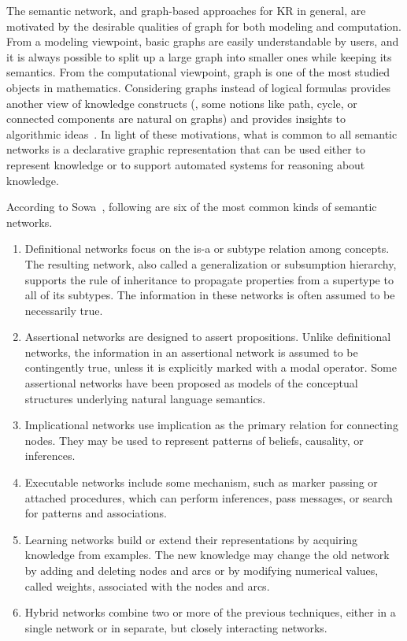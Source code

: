 The semantic network, and graph-based approaches for KR in general, are motivated by the desirable qualities of graph for both modeling and computation. From a modeling viewpoint, basic graphs are easily understandable by users, and it is always possible to split up a large graph into smaller ones while keeping its semantics. From the computational viewpoint, graph is one of the most studied objects in mathematics. Considering graphs instead of logical formulas provides another view of knowledge constructs (\eg, some notions like path, cycle, or connected components are natural on graphs) and provides insights to algorithmic ideas~\cite{CheinMugnier08}. In light of these motivations, what is common to all semantic networks is a declarative graphic representation that can be used either to represent knowledge or to support automated systems for reasoning about knowledge.

According to Sowa~\cite{Sowa1987SemanticNet}, following are six of the most common kinds of semantic networks.
\begin{enumerate}
\item Definitional networks focus on the is-a or subtype relation among concepts. The resulting network, also called a generalization or subsumption hierarchy, supports the rule of inheritance to propagate properties from a supertype to all of its subtypes. The information in these networks is often assumed to be necessarily true.

\item Assertional networks are designed to assert propositions. Unlike definitional networks, the information in an assertional network is assumed to be contingently true, unless it is explicitly marked with a modal operator. Some assertional networks have been proposed as models of the conceptual structures underlying natural language semantics.

\item Implicational networks use implication as the primary relation for connecting nodes. They may be used to represent patterns of beliefs, causality, or inferences.

\item Executable networks include some mechanism, such as marker passing or attached procedures, which can perform inferences, pass messages, or search for patterns and associations.

\item Learning networks build or extend their representations by acquiring knowledge from examples. The new knowledge may change the old network by adding and deleting nodes and arcs or by modifying numerical values, called weights, associated with the nodes and arcs.

\item Hybrid networks combine two or more of the previous techniques, either in a single network or in separate, but closely interacting networks.
\end{enumerate}

